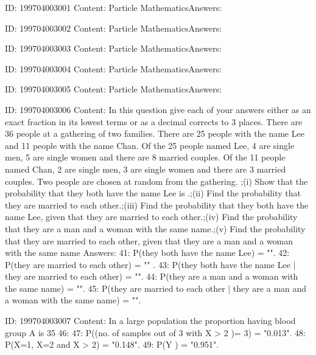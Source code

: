 \documentclass{article}
\begin{document}
ID: 199704003001
Content:
Particle MathematicsAnswers:

ID: 199704003002
Content:
Particle MathematicsAnswers:

ID: 199704003003
Content:
Particle MathematicsAnswers:

ID: 199704003004
Content:
Particle MathematicsAnswers:

ID: 199704003005
Content:
Particle MathematicsAnswers:

ID: 199704003006
Content:
In this question give each of your answers either as an exact fraction in its lowest terms or as a decimal corrects to 3 places.  There are 36 people at a gathering of two families. There are 25 people with the name Lee and 11 people with the name Chan. Of the 25 people named Lee, 4 are single men, 5 are single women and there are 8 married couples. Of the 11 people named Chan, 2 are single men, 3 are single women and there are 3 married couples. Two people are chosen at random from the gathering. ;(i) Show that the probability that they both have the name Lee is  .;(ii) Find the probability that they are married to each other.;(iii) Find the probability that they both have the name Lee, given that they are married to each other.;(iv) Find the probability that they are a man and a woman with the same name.;(v) Find the probability that they are married to each other, given that they are a man and a woman with the same name Answers:
41: P(they both have the name Lee) = "".
42: P(they are married to each other) = "" .
43: P(they both have the name Lee | they are married to each other) = "".
44: P(they are a man and a woman with the same name) = "".
45: P(they are married to each other | they are a man and a woman with the same name) = "".

ID: 199704003007
Content:
In a large population the proportion having blood group A is 35%
46: 
47: P((no. of samples out of 3 with X > 2 )= 3) = "0.013".
48: P(X=1, X=2 and X > 2) = "0.148".
49: P(Y ) = "0.951".
\end{document}
